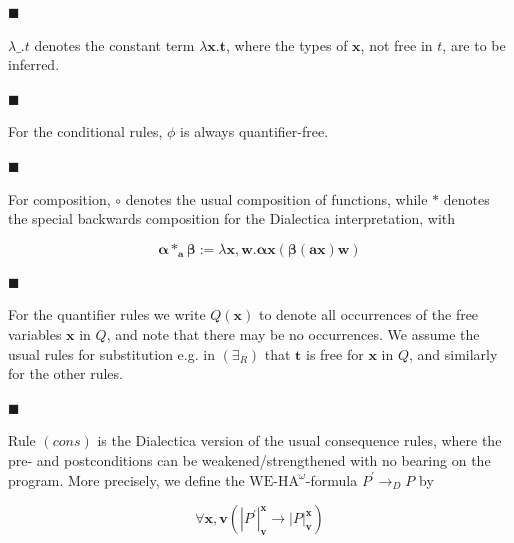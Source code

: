 \documentclass[10pt,a4paper]{article}
\begin{document}
 
\par\noindent  $\blacksquare$ 
 
$\lambda\_.t$ denotes the constant term $\lambda\bm{x}.\bm{t}$, where the types of $\bm{x}$, not free in $t$, are to be inferred.\par
 
 
 
\par\noindent  $\blacksquare$ 
 
For the conditional rules, $\phi$ is always quantifier-free.\par
 
 
 
\par\noindent  $\blacksquare$ 
 
For composition, $\circ$ denotes the usual composition of functions, while $\ast$ denotes the special backwards composition for the Dialectica interpretation, with\par
  
\par  \quad  \[\bm{\alpha}\ast_{\bm{a}}\bm{\beta}:=\lambda\bm{x},\bm{w}.\bm{\alpha}\bm{x}\left(\bm{\beta}(\bm{a}\bm{x})\bm{w}\right)\]\quad  \quad  
  
 
 
\par\noindent  $\blacksquare$ 
 
For the quantifier rules we write $Q(\bm{x})$ to denote all occurrences of the free variables $\bm{x}$ in $Q$, and note that there may be no occurrences. We assume the usual rules for substitution e.g. in $(\exists_{R})$ that $\bm{t}$ is free for $\bm{x}$ in $Q$, and similarly for the other rules.\par
 
 
 
\par\noindent  $\blacksquare$ 
 
Rule $(cons)$ is the Dialectica version of the usual consequence rules, where the pre- and postconditions can be weakened/strengthened with no bearing on the program. More precisely, we define the $\mathrm{WE}\mbox{-}\mathrm{HA}^{\omega}$-formula $P^{\prime}\to_{D}P$ by\par
  
\par  \quad  \[\forall\bm{x},\bm{v}\left(|{P^{\prime}}|^{\bm{x}}_{\bm{v}}\to|{P}|^{\bm{x}}_{\bm{v}}\right)\]\quad  \quad  
  
\end{document}

